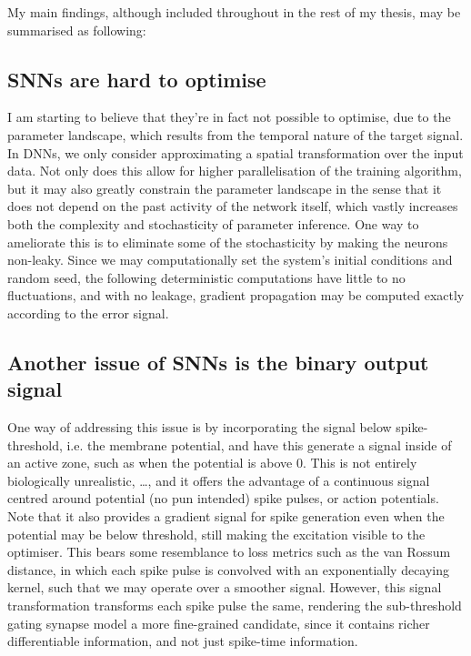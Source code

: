 \documentclass[mphil,deptreport,ai]{infthesis} %
\begin{document}
My main findings, although included throughout in the rest of my thesis, may be summarised as following:
\subsection{SNNs are hard to optimise}
I am starting to believe that they’re in fact not possible to optimise, due to the parameter landscape, which results from the temporal nature of the target signal.
In DNNs, we only consider approximating a spatial transformation over the input data. Not only does this allow for higher parallelisation of the training algorithm, but it may also greatly constrain the parameter landscape in the sense that it does not depend on the past activity of the network itself, which vastly increases both the complexity and stochasticity of parameter inference. 
One way to ameliorate this is to eliminate some of the stochasticity by making the neurons non-leaky. Since we may computationally set the system’s initial conditions and random seed, the following deterministic computations have little to no fluctuations, and with no leakage, gradient propagation may be computed exactly according to the error signal.

\subsection{Another issue of SNNs is the binary output signal}
One way of addressing this issue is by incorporating the signal below spike-threshold, i.e. the membrane potential, and have this generate a signal inside of an active zone, such as when the potential is above 0. This is not entirely biologically unrealistic, …, and it offers the advantage of a continuous signal centred around potential (no pun intended) spike pulses, or action potentials. Note that it also provides a gradient signal for spike generation even when the potential may be below threshold, still making the excitation visible to the optimiser.
This bears some resemblance to loss metrics such as the van Rossum distance, in which each spike pulse is convolved with an exponentially decaying kernel, such that we may operate over a smoother signal. However, this signal transformation transforms each spike pulse the same, rendering the sub-threshold gating synapse model a more fine-grained candidate, since it contains richer differentiable information, and not just spike-time information.
\end{document}
